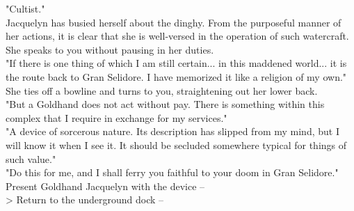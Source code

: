 "Cultist."\\

Jacquelyn has busied herself about the dinghy. From the purposeful manner of her actions, it is clear that she is well-versed in the operation of such watercraft. She speaks to you without pausing in her duties.\\

"If there is one thing of which I am still certain... in this maddened world... it is the route back to Gran Selidore. I have memorized it like a religion of my own."\\

She ties off a bowline and turns to you, straightening out her lower back.\\

"But a Goldhand does not act without pay. There is something within this complex that I require in exchange for my services."\\

"A device of sorcerous nature. Its description has slipped from my mind, but I will know it when I see it. It should be secluded somewhere typical for things of such value."\\

"Do this for me, and I shall ferry you faithful to your doom in Gran Selidore."\\

 Present Goldhand Jacquelyn with the device -- \\
> Return to the underground dock -- 